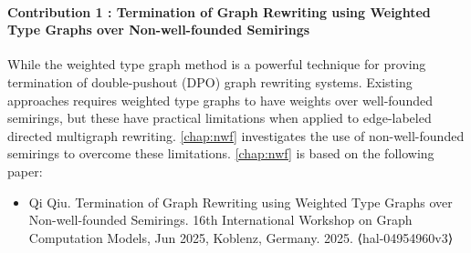 
\paragraph{Contribution 1 : Termination of Graph Rewriting using Weighted Type Graphs over Non-well-founded Semirings} 
While the weighted type graph method is a powerful technique for proving termination of double-pushout (DPO) graph rewriting systems. 
Existing approaches requires
 weighted type graphs to have weights over well-founded semirings, but these have practical limitations when applied to edge-labeled directed multigraph rewriting. \autoref{chap:nwf} investigates the use of non-well-founded semirings to overcome these limitations. \autoref{chap:nwf} is based on the following paper:
\begin{itemize}
    \item Qi Qiu. Termination of Graph Rewriting using Weighted Type Graphs over Non-well-founded Semirings. 16th International Workshop on Graph Computation Models, Jun 2025, Koblenz, Germany. 2025. ⟨hal-04954960v3⟩
\end{itemize}
 
